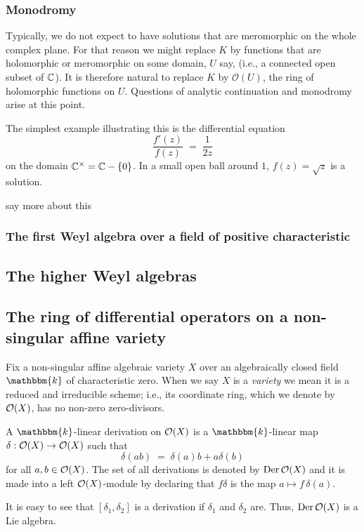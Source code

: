 \documentclass[12pt]{article}
\newcommand{\Bbbk}{\mathbbm{k}}
\newcommand{\CC}{\bbC}
\newcommand{\cO}{\mathcal O}
\begin{document}
\subsubsection{Monodromy}
Typically, we do not expect to have solutions that are meromorphic on the whole complex plane. For that reason we might replace 
$K$ by functions that are holomorphic or meromorphic on some domain, $U$ say, (i.e., a connected open subset of $\CC$).  
It is therefore natural to replace $K$ by $\cO(U)$, the ring of holomorphic functions on $U$. Questions of analytic continuation and
monodromy arise at this point. 

The simplest example illustrating this is the differential equation
$$
\frac{f'(z)}{f(z)} \; = \; \frac{1}{2z}
$$
on the domain $\CC^\times = \CC-\{0\}$. In a small open ball around $1$, $f(z)=\sqrt{z}$ is a solution. 


{\color{red} say more about this}



\subsubsection{The first Weyl algebra over a field of positive characteristic}


\subsection{The higher Weyl algebras}



\subsection{The ring of differential operators on a non-singular affine variety} 
Fix a non-singular affine algebraic variety $X$ over an algebraically closed field $\Bbbk$ of characteristic zero.
When we say $X$ is a {\it variety} we mean it is a reduced and irreducible scheme; i.e., its coordinate ring, which we denote by 
$\mathcal{O}(X)$, has no non-zero zero-divisors. 

A {\sf $\Bbbk$-linear derivation} on $\mathcal{O}(X)$ is a $\Bbbk$-linear map $\delta:\mathcal{O}(X) \to \mathcal{O}(X)$ such that
$$
\delta(ab) \;=\; \delta(a)b+a\delta(b)
$$
for all $a,b \in \mathcal{O}(X)$. The set of all derivations is denoted by ${\rm Der}\, \mathcal{O}(X)$ and it is made into a left $\mathcal{O}(X)$-module by
declaring that $f\delta$ is the map $a \mapsto f\, \delta(a)$.

It is easy to see that $[\delta_1,\delta_2]$ is a derivation if $\delta_1$ and $\delta_2$ are. 
Thus, ${\rm Der}\, \mathcal{O}(X)$ is a Lie algebra.
\end{document}

